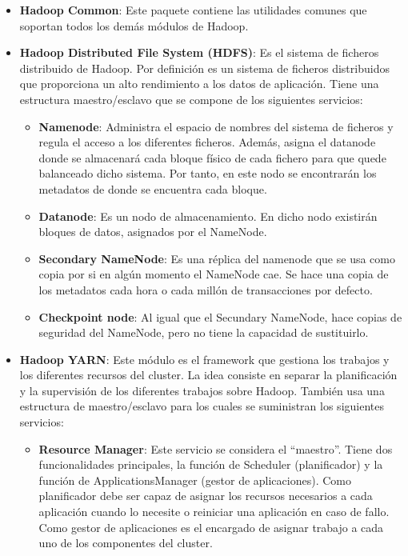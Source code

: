 \begin{itemize}
	\item \textbf{Hadoop Common}: Este paquete contiene las utilidades comunes que soportan todos los demás módulos de Hadoop.
	\item \textbf{Hadoop Distributed File System (HDFS)}: Es el sistema de ficheros distribuido de Hadoop. Por definición es un sistema de ficheros distribuidos que proporciona un alto rendimiento a los datos de aplicación. Tiene una estructura maestro/esclavo que se compone de los siguientes servicios:
	\begin{itemize}
		\item \textbf{Namenode}: Administra el espacio de nombres del sistema de ficheros y regula el acceso a los diferentes ficheros. Además, asigna el datanode donde se almacenará cada bloque físico de cada fichero para que quede balanceado dicho sistema. Por tanto, en este nodo se encontrarán los metadatos de donde se encuentra cada bloque.
		\item \textbf{Datanode}: Es un nodo de almacenamiento. En dicho nodo existirán bloques de datos, asignados por el NameNode.
		\item \textbf{Secondary NameNode}: Es una réplica del namenode que se usa como copia por si en algún momento el NameNode cae. Se hace una copia de los metadatos cada hora o cada millón de transacciones por defecto.
		\item \textbf{Checkpoint node}: Al igual que el Secundary NameNode, hace copias de seguridad del NameNode, pero no tiene la capacidad de sustituirlo.
	\end{itemize}
	\item \textbf{Hadoop YARN}: Este módulo es el framework que gestiona los trabajos y los diferentes recursos del cluster. La idea consiste en separar la planificación y la supervisión de los diferentes trabajos sobre Hadoop. También usa una estructura de maestro/esclavo para los cuales se suministran los siguientes servicios:
	\begin{itemize}
		\item \textbf{Resource Manager}: Este servicio se considera el “maestro”. Tiene dos funcionalidades principales, la función de Scheduler (planificador) y la función de ApplicationsManager (gestor de aplicaciones). Como planificador debe ser capaz de asignar los recursos necesarios a cada aplicación cuando lo necesite o reiniciar una aplicación en caso de fallo. Como gestor de aplicaciones es el encargado de asignar trabajo a cada uno de los componentes del cluster.

\end{itemize}
\end{itemize}
